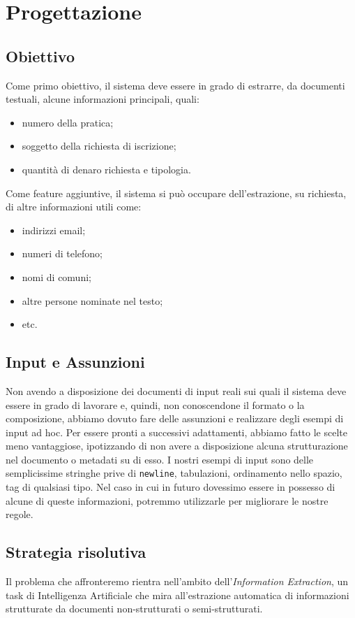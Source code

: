 \section{Progettazione}

\label{sec:Progettazione}

\subsection{Obiettivo}
Come primo obiettivo, il sistema deve essere in grado di estrarre, da documenti testuali, alcune informazioni principali, quali:
\begin{itemize}
\item numero della pratica; %
\item soggetto della richiesta di iscrizione;
\item quantità di denaro richiesta e tipologia.
\end{itemize}

Come feature aggiuntive, il sistema si può occupare dell'estrazione, su richiesta, di altre informazioni utili come:
\begin{itemize}
\item indirizzi email;
\item numeri di telefono;
\item nomi di comuni;
\item altre persone nominate nel testo;
\item etc.
\end{itemize}


\subsection{Input e Assunzioni}
Non avendo a disposizione dei documenti di input reali sui quali il sistema deve essere in grado di lavorare e, quindi, non conoscendone il formato o la composizione, abbiamo dovuto fare delle assunzioni e realizzare degli esempi di input ad hoc.
Per essere pronti a successivi adattamenti, abbiamo fatto le scelte meno vantaggiose, ipotizzando di non avere a disposizione alcuna strutturazione nel documento o metadati su di esso.
I nostri esempi di input sono delle semplicissime stringhe prive di \verb+newline+, tabulazioni, ordinamento nello spazio, tag di qualsiasi tipo.
Nel caso in cui in futuro dovessimo essere in possesso di alcune di queste informazioni, potremmo utilizzarle per migliorare le nostre regole.


\subsection{Strategia risolutiva}
Il problema che affronteremo rientra nell'ambito dell'\emph{Information Extraction}, un task di Intelligenza Artificiale che mira all'estrazione automatica di informazioni strutturate da documenti non-strutturati o semi-strutturati.

